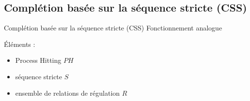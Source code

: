 \documentclass[french]{beamer}
\begin{document}
\subsection{Complétion basée sur la séquence stricte (CSS)}
\begin{frame}{Complétion basée sur la séquence stricte (CSS)}
Fonctionnement analogue\par
\vspace{1cm}
Éléments :
\begin{itemize}
\item Process Hitting $PH$
\item séquence stricte $S$
\item ensemble de relations de régulation $R$
\end{itemize}
\end{frame}
\end{document}
